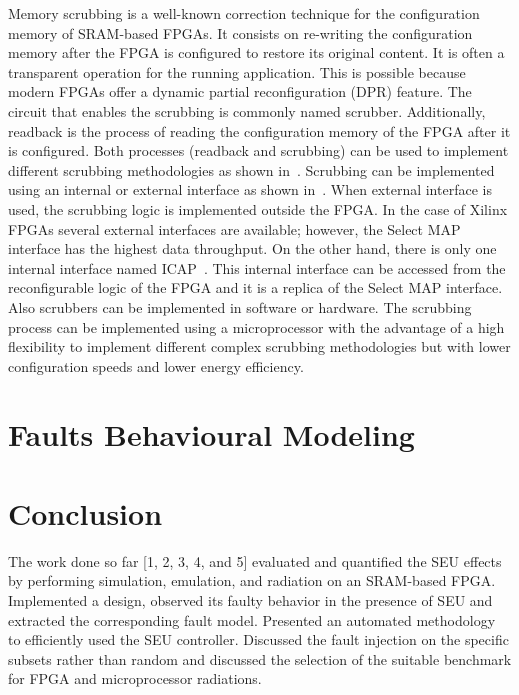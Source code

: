 Memory scrubbing is a well-known correction technique for the configuration memory of SRAM-based FPGAs. It consists on re-writing the configuration memory after the FPGA is configured to restore its original content. It is often a transparent operation for the running application. This is possible because modern FPGAs offer a dynamic partial reconfiguration (DPR) feature. The circuit that enables the scrubbing is commonly named scrubber. Additionally, readback is the process of reading the configuration memory of the FPGA after it is configured. Both processes (readback and scrubbing) can be used to implement different scrubbing methodologies as shown in~\cite{herrera2013design}. Scrubbing can be implemented using an internal or external interface as shown in~\cite{berg2008effectiveness}. When external interface is used, the scrubbing logic is implemented outside the FPGA. In the case of Xilinx FPGAs several external interfaces are available; however, the Select MAP interface has the highest data throughput. On the other hand, there is only one internal interface named ICAP~\cite{xilinx}. This internal interface can be accessed from the reconfigurable logic of the FPGA and it is a replica of the Select MAP interface. Also scrubbers can be implemented in software or hardware. The scrubbing process can be implemented using a microprocessor with the advantage of a high flexibility to implement different complex scrubbing methodologies but with lower configuration speeds and lower energy efficiency.

\section{Faults Behavioural Modeling}


\section{Conclusion}
The work done so far [1, 2, 3, 4, and 5] evaluated and quantified the SEU effects by performing simulation, emulation, and radiation on an SRAM-based FPGA. Implemented a design, observed its faulty behavior in the presence of SEU and extracted the corresponding fault model. Presented an automated methodology to efficiently used the SEU controller. Discussed the fault injection on the specific subsets rather than random and discussed the selection of the suitable benchmark for FPGA and microprocessor radiations. 




